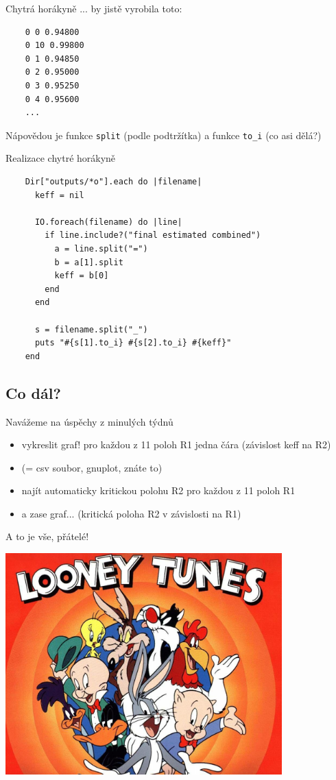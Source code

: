 \documentclass{beamer}
\begin{document}
\begin{frame}[fragile]{Chytrá horákyně}
  ... by jistě vyrobila toto:
  {\scriptsize
  \begin{verbatim}
    0 0 0.94800
    0 10 0.99800
    0 1 0.94850
    0 2 0.95000
    0 3 0.95250
    0 4 0.95600
    ...
  \end{verbatim}
  }
  Nápovědou je funkce \texttt{split} (podle podtržítka) a funkce \texttt{to\_i} (co asi dělá?)
\end{frame}

\begin{frame}[fragile]{Realizace chytré horákyně}
  \scriptsize
  \begin{verbatim}
    Dir["outputs/*o"].each do |filename|
      keff = nil

      IO.foreach(filename) do |line|
        if line.include?("final estimated combined")
          a = line.split("=")
          b = a[1].split
          keff = b[0]
        end
      end

      s = filename.split("_")
      puts "#{s[1].to_i} #{s[2].to_i} #{keff}"
    end
  \end{verbatim}
\end{frame}

\subsection{Co dál?}

\begin{frame}{Navážeme na úspěchy z minulých týdnů}
  \begin{itemize}
    \item vykreslit graf! pro každou z 11 poloh R1 jedna čára (závislost keff na R2)
    \item (= csv soubor, gnuplot, znáte to)
    \item najít automaticky kritickou polohu R2 pro každou z 11 poloh R1
    \item a zase graf... (kritická poloha R2 v závislosti na R1)
  \end{itemize}
\end{frame}

\begin{frame}{A to je vše, přátelé!}
  \begin{center}
    \includegraphics[width=0.8\textwidth]{looney_tunes}
  \end{center}
\end{frame}
\end{document}
